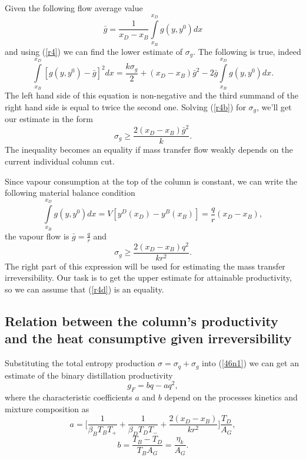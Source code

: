 \documentclass[12pt]{article}
\begin{document}
Given the following flow average value
\begin{equation}
\bar{g}=\frac{1}{x_D-x_B}\int\limits^{x_D}_{x_B} g(y, y^0)dx
\label{r4a}
\end{equation}
and using (\ref{r4}) we can find the lower estimate of $\sigma_g$. The following is true, indeed
\begin{equation}
\int\limits^{x_D}_{x_B} [g(y, y^0)-\bar{g}]^2 dx=\frac{k\sigma_g}{2}+(x_D-x_B)\bar{g}^2-2\bar{g}\int\limits^{x_D}_{x_B} g(y, y^0)dx.
\label{r4b}
\end{equation}
The left hand side of this equation is non-negative and the third summand of the right hand side is equal to twice the second one. Solving (\ref{r4b}) for $\sigma_g$, we'll get our estimate in the form
\begin{equation}
\sigma_g\geq\frac{2(x_D-x_B)\bar{g}^2}{k}.
\label{r4c}
\end{equation}
The inequality becomes an equality if mass transfer flow weakly depends on the current individual column cut.

Since vapour consumption at the top of the column is constant, we can write the following material balance condition 
\begin{equation}
\int\limits^{x_{D}}_{x_{B}}\!g(y , y^0 ) dx=V[y^D(x_D)-y^B(x_B)]=\frac{q}{r}(x_D-x_B),
\label{q8}
\end{equation}
the vapour flow is $\bar{g}=\frac{q}{r}$ and
\begin{equation}
\sigma_g\geq\frac{2(x_D-x_B)q^2}{kr^2}.
\label{r4d}
\end{equation}
The right part of this expression will be used for estimating the mass transfer irreversibility. Our task is to get the upper estimate for attainable productivity, so we can assume that (\ref{r4d}) is an equality.

\subsection {Relation between the column's productivity and the heat consumptive given irreversibility}
Substituting the total entropy production $\sigma = \sigma_q + \sigma_g$ into (\ref{46n1}) we can get an estimate of the binary distillation productivity
\begin{equation}
g_F= bq-aq^2, 
\label{w4e}
\end{equation} 
where the characteristic coefficients $a$ and $b$ depend on the processes kinetics and mixture composition as
 \begin{equation}
 a=\Big[\frac{1}{\beta_{B}T_B T_{+}} +\frac{1}{\beta_{D}T_D T_{-}}+\frac{2(x_D-x_B)}{kr^2}\Big]\frac{T_D}{A_G},
\label{r4e}
\end{equation} 
\begin{equation}
 b=\frac{T_B - T_D}{T_B A_G}=\frac{\eta_k}{A_G}.
\label{b4e}
\end{equation} 
\end{document}
